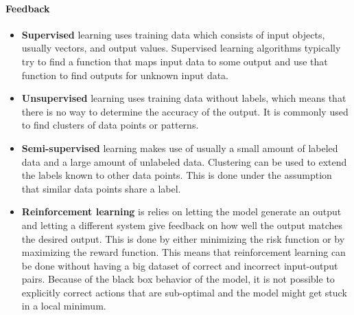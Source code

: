 \paragraph{Feedback}
\begin{itemize}
	\item \textbf{Supervised}
		learning uses training data which consists of input objects, usually vectors, and output values. Supervised learning algorithms typically try to find a function that maps input data to some output and use that function to find outputs for unknown input data.
	\item \textbf{Unsupervised}
		learning uses training data without labels, which means that there is no way to determine the accuracy of the output. It is commonly used to find clusters of data points or patterns.
	\item \textbf{Semi-supervised}
		learning makes use of usually a small amount of labeled data and a large amount of unlabeled data. Clustering can be used to extend the labels known to other data points. This is done under the assumption that similar data points share a label.
	\item \textbf{Reinforcement learning}
		is relies on letting the model generate an output and letting a different system give feedback on how well the output matches the desired output. This is done by either minimizing the risk function or by maximizing the reward function. This means that reinforcement learning can be done without having a big dataset of correct and incorrect input-output pairs. Because of the black box behavior of the model, it is not possible to explicitly correct actions that are sub-optimal and the model might get stuck in a local minimum.
\end{itemize}

